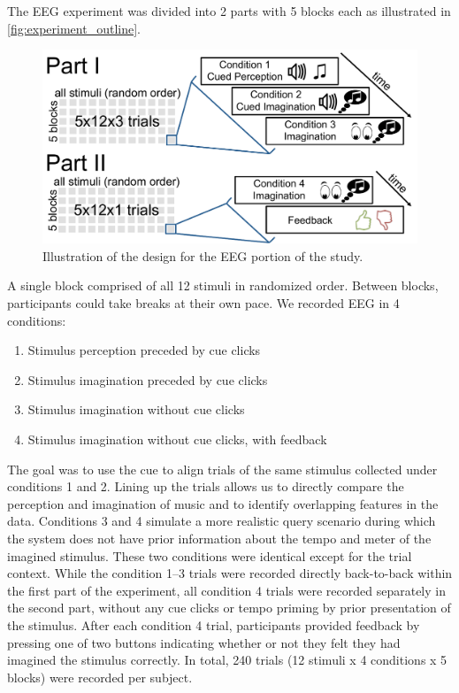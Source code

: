 The EEG experiment was divided into 2 parts with 5 blocks each as illustrated in \autoref{fig:experiment_outline}.
\begin{figure}[htbp]
  \begin{center}
    \includegraphics[scale=0.6]{Figures/study_design_small.pdf}
    \caption{%
Illustration of the design for the EEG portion of the study.
}
    \label{fig:experiment_outline}
  \end{center}
\end{figure}
A single block comprised of all 12 stimuli in randomized order.
Between blocks, participants could take breaks at their own pace.
We recorded EEG in 4 conditions:
\begin{enumerate}
\item
Stimulus perception preceded by cue clicks
\item
Stimulus imagination preceded by cue clicks
\item
Stimulus imagination without cue clicks
\item
Stimulus imagination without cue clicks, with feedback
\end{enumerate}

The goal was to use the cue to align trials of the same stimulus collected under conditions 1 and 2. Lining up the trials allows us to directly compare the perception and imagination of music and to identify overlapping features in the data. 
Conditions 3 and 4 simulate a more realistic query scenario during which the system does not have prior information about the tempo and meter of the imagined stimulus.
These two conditions were identical except for the trial context.
While the condition 1--3 trials were recorded directly back-to-back within the first part of the experiment, 
all condition 4 trials were recorded separately in the second part, without any cue clicks or tempo priming by prior presentation of the stimulus.
After each condition 4 trial, participants provided feedback by pressing one of two buttons indicating whether or not they felt they had imagined the stimulus correctly.
In total, 240 trials (12 stimuli x 4 conditions x 5 blocks) were recorded per subject.

